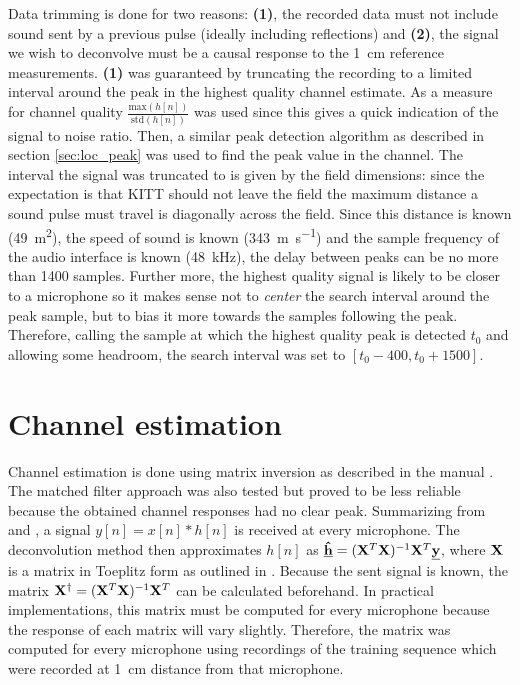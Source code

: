 \documentclass[11pt,titlepage]{report}
\begin{document}
Data trimming is done for two reasons: \textbf{(1)}, the recorded data must not include sound sent by a previous pulse (ideally including reflections) and \textbf{(2)}, the signal we wish to deconvolve must be a causal response to the \SI{1}{\centi\meter} reference measurements. \textbf{(1)} was guaranteed by truncating the recording to a limited interval around the peak in the highest quality channel estimate. As a measure for channel quality $\frac{\text{max}(h[n])}{\text{std}(h[n])}$ was used since this gives a quick indication of the signal to noise ratio. Then, a similar peak detection algorithm as described in section \ref{sec:loc_peak} was used to find the peak value in the channel. The interval the signal was truncated to is given by the field dimensions: since the expectation is that KITT should not leave the field the maximum distance a sound pulse must travel is diagonally across the field. Since this distance is known (\SI{49}{\meter\squared}), the speed of sound is known (\SI{343}{\meter\per\second}) and the sample frequency of the audio interface is known (\SI{48}{\kilo\hertz}), the delay between peaks can be no more than \num{1400} samples. Further more, the highest quality signal is likely to be closer to a microphone so it makes sense not to \textit{center} the search interval around the peak sample, but to bias it more towards the samples following the peak. Therefore, calling the sample at which the highest quality peak is detected $t_0$ and allowing some headroom, the search interval was set to $[t_0 - 400, t_0 +1500]$.

\section{Channel estimation}
\label{sec:loc_est_h}
Channel estimation is done using matrix inversion as described in the manual \cite{epo4-manual}. The matched filter approach was also tested but proved to be less reliable because the obtained channel responses had no clear peak. Summarizing from \cite{epo4-manual} and \cite{epo4-del7}, a signal $y[n]=x[n]*h[n]$ is received at every microphone. The deconvolution method then approximates $h[n]$ as $\mathbf{\underline{\hat{h}}}=(\mathbf{X}^T\mathbf{X})^{-1}\mathbf{X}^T\mathbf{\underline{y}}$, where $\mathbf{X}$ is a matrix in Toeplitz form as outlined in \cite{epo4-manual}. Because the sent signal is known, the matrix $\mathbf{X}^\dagger=(\mathbf{X}^T\mathbf{X})^{-1}\mathbf{X}^T$ can be calculated beforehand. In practical implementations, this matrix must be computed for every microphone because the response of each matrix will vary slightly. Therefore, the matrix was computed for every microphone using recordings of the training sequence which were recorded at \SI{1}{cm} distance from that microphone.
\end{document}
